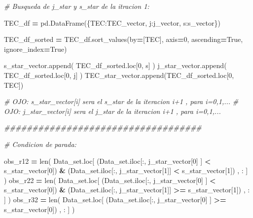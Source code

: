 \documentclass[
  11pt,
  a4paper,
]{article}
\newenvironment{Shaded}{\begin{snugshade}}{\end{snugshade}}
\newcommand{\BuiltInTok}[1]{#1}
\newcommand{\CommentTok}[1]{\textcolor[rgb]{0.56,0.35,0.01}{\textit{#1}}}
\newcommand{\DecValTok}[1]{\textcolor[rgb]{0.00,0.00,0.81}{#1}}
\newcommand{\NormalTok}[1]{#1}
\newcommand{\OperatorTok}[1]{\textcolor[rgb]{0.81,0.36,0.00}{\textbf{#1}}}
\newcommand{\StringTok}[1]{\textcolor[rgb]{0.31,0.60,0.02}{#1}}
\newcommand{\VariableTok}[1]{\textcolor[rgb]{0.00,0.00,0.00}{#1}}
\begin{document}
\begin{Shaded}
\begin{Highlighting}[]
        \CommentTok{\# Busqueda de j\_star y s\_star de la itracion 1:}

\NormalTok{        TEC\_df }\OperatorTok{=}\NormalTok{ pd.DataFrame(\{}\StringTok{\textquotesingle{}TEC\textquotesingle{}}\NormalTok{:TEC\_vector, }\StringTok{\textquotesingle{}j\textquotesingle{}}\NormalTok{:j\_vector, }\StringTok{\textquotesingle{}s\textquotesingle{}}\NormalTok{:s\_vector\})}

\NormalTok{        TEC\_df\_sorted }\OperatorTok{=}\NormalTok{ TEC\_df.sort\_values(by}\OperatorTok{=}\NormalTok{[}\StringTok{\textquotesingle{}TEC\textquotesingle{}}\NormalTok{], axis}\OperatorTok{=}\DecValTok{0}\NormalTok{, ascending}\OperatorTok{=}\VariableTok{True}\NormalTok{, ignore\_index}\OperatorTok{=}\VariableTok{True}\NormalTok{)}

\NormalTok{        s\_star\_vector.append( TEC\_df\_sorted.loc[}\DecValTok{0}\NormalTok{, }\StringTok{\textquotesingle{}s\textquotesingle{}}\NormalTok{] )}
\NormalTok{        j\_star\_vector.append( TEC\_df\_sorted.loc[}\DecValTok{0}\NormalTok{, }\StringTok{\textquotesingle{}j\textquotesingle{}}\NormalTok{] )}
\NormalTok{        TEC\_star\_vector.append(TEC\_df\_sorted.loc[}\DecValTok{0}\NormalTok{, }\StringTok{\textquotesingle{}TEC\textquotesingle{}}\NormalTok{])}

        \CommentTok{\# OJO: s\_star\_vector[i] sera el s\_star de la iteracion i+1 , para i=0,1,...}
        \CommentTok{\# OJO: j\_star\_vector[i] sera el j\_star de la iteracion i+1 , para i=0,1,... }


      \CommentTok{\#\#\#\#\#\#\#\#\#\#\#\#\#\#\#\#\#\#\#\#\#\#\#\#\#\#\#\#\#\#\#\#\#\#\#}

        \CommentTok{\# Condicion de parada:}

\NormalTok{        obs\_r12 }\OperatorTok{=} \BuiltInTok{len}\NormalTok{( Data\_set.loc[ (Data\_set.iloc[:, j\_star\_vector[}\DecValTok{0}\NormalTok{] ] }\OperatorTok{\textless{}}\NormalTok{ s\_star\_vector[}\DecValTok{0}\NormalTok{]) }\OperatorTok{\&}\NormalTok{ (Data\_set.iloc[:, j\_star\_vector[}\DecValTok{1}\NormalTok{]] }\OperatorTok{\textless{}}\NormalTok{ s\_star\_vector[}\DecValTok{1}\NormalTok{]) , : ] )}
\NormalTok{        obs\_r22 }\OperatorTok{=} \BuiltInTok{len}\NormalTok{( Data\_set.loc[ (Data\_set.iloc[:, j\_star\_vector[}\DecValTok{0}\NormalTok{] ] }\OperatorTok{\textless{}}\NormalTok{ s\_star\_vector[}\DecValTok{0}\NormalTok{]) }\OperatorTok{\&}\NormalTok{ (Data\_set.iloc[:, j\_star\_vector[}\DecValTok{1}\NormalTok{]] }\OperatorTok{\textgreater{}=}\NormalTok{ s\_star\_vector[}\DecValTok{1}\NormalTok{]) , : ] )}
\NormalTok{        obs\_r32 }\OperatorTok{=} \BuiltInTok{len}\NormalTok{( Data\_set.loc[ (Data\_set.iloc[:, j\_star\_vector[}\DecValTok{0}\NormalTok{] ] }\OperatorTok{\textgreater{}=}\NormalTok{ s\_star\_vector[}\DecValTok{0}\NormalTok{]) , : ] )}


\end{Highlighting}
\end{Shaded}
\end{document}
